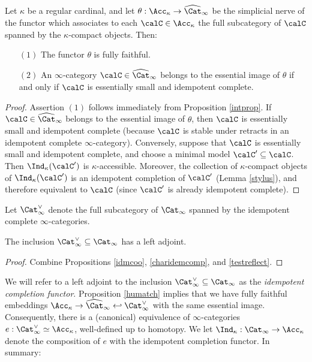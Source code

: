 \begin{proposition}\label{humatch}
Let $\kappa$ be a regular cardinal, and let $\theta: \Acc_{\kappa} \rightarrow \widehat{\Cat}_{\infty}$ be the simplicial nerve of the functor which associates to each $\calC \in \Acc_{\kappa}$ the full subcategory of $\calC$ spanned by the $\kappa$-compact objects. Then:
\begin{itemize}
\item[$(1)$] The functor $\theta$ is fully faithful. 
\item[$(2)$] An $\infty$-category $\calC \in \widehat{\Cat}_{\infty}$ belongs to the essential image of $\theta$ if and only if $\calC$ is essentially small and idempotent complete.
\end{itemize}
\end{proposition}

\begin{proof}
Assertion $(1)$ follows immediately from Proposition \ref{intprop}. If $\calC \in \widehat{\Cat}_{\infty}$ belongs to the essential image of $\theta$, then $\calC$ is
essentially small and idempotent complete (because $\calC$ is stable under retracts in an idempotent complete $\infty$-category). Conversely, suppose that $\calC$ is essentially small and idempotent complete, and choose a minimal model $\calC' \subseteq \calC$. Then $\Ind_{\kappa}(\calC')$ is $\kappa$-accessible. Moreover, the collection of $\kappa$-compact objects of $\Ind_{\kappa}(\calC')$ is an idempotent completion of $\calC'$ (Lemma \ref{stylus}), and therefore equivalent to $\calC$ (since $\calC'$ is already idempotent complete).
\end{proof}

Let $\Cat_{\infty}^{\vee}$ denote the full subcategory of $\Cat_{\infty}$ spanned by the idempotent complete $\infty$-categories.

\begin{proposition}
The inclusion $\Cat_{\infty}^{\vee} \subseteq \Cat_{\infty}$ has a left adjoint.
\end{proposition}

\begin{proof}
Combine Propositions \ref{idmcoo}, \ref{charidemcomp}, and \ref{testreflect}.
\end{proof}

We will refer to a left adjoint to the inclusion $\Cat_{\infty}^{\vee} \subseteq \Cat_{\infty}$ as the
{\it idempotent completion functor}. Proposition \ref{humatch} implies that we have fully faithful embeddings $\Acc_{\kappa} \rightarrow \widehat{\Cat}_{\infty} \hookleftarrow \Cat_{\infty}^{\vee}$ with the same essential image. Consequently, there is a (canonical) equivalence of $\infty$-categories $e: \Cat_{\infty}^{\vee} \simeq \Acc_{\kappa}$, well-defined up to homotopy. We let
$\Ind_{\kappa}: \Cat_{\infty} \rightarrow \Acc_{\kappa}$ denote the composition of $e$ with the idempotent completion functor. In summary:

